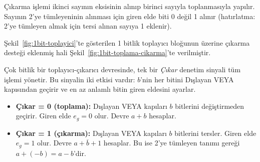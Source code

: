 Çıkarma işlemi ikinci sayının eksisinin alınıp birinci sayıyla toplanmasıyla yapılır. Sayının 2'ye tümleyeninin alınması için giren elde biti 0 değil 1 alınır (hatırlatma: 2'ye tümleyen almak için tersi alınan sayıya 1 eklenir).

Şekil~\ref{fig:1bit-toplayici}'te gösterilen 1 bitlik toplayıcı bloğunun üzerine çıkarma desteği eklenmiş hali Şekil~\ref{fig:1bit-toplama-cikarma}'te verilmiştir.

Çok bitlik bir toplayıcı-çıkarıcı devresinde, tek bir \emph{Çıkar} denetim sinyali tüm işlemi yönetir. Bu sinyalin iki etkisi vardır: $b$'nin her bitini Dışlayan VEYA kapısından geçirir ve en az anlamlı bitin giren eldesini ayarlar.

\begin{itemize}
    \item \textbf{Çıkar = 0 (toplama):} Dışlayan VEYA kapıları $b$ bitlerini değiştirmeden geçirir. Giren elde $e_{g}=0$ olur. Devre $a + b$ hesaplar.
    \item \textbf{Çıkar = 1 (çıkarma):} Dışlayan VEYA kapıları $b$ bitlerini tersler. Giren elde $e_{g}=1$ olur. Devre $a + \overline{b} + 1$ hesaplar. Bu ise 2'ye tümleyen tanımı gereği $a + (-b) = a - b$'dir.
\end{itemize}


